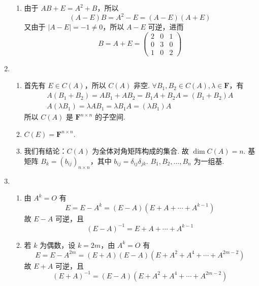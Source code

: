 \begin{enumerate}
\begin{enumerate}
              \item 由于 $ AB + E = A^2 + B $，所以
                    \[ (A - E)B = A^2 - E = (A - E)(A + E) \]
                    又由于 $ |A - E| = -1 \neq 0 $，所以 $ A - E $ 可逆，进而
                    \[ B = A + E = \begin{pmatrix}
                            2 & 0 & 1 \\
                            0 & 3 & 0 \\
                            1 & 0 & 2
                        \end{pmatrix} \]
          \end{enumerate}

    \item \begin{enumerate}
              \item 首先有 $ E \in C(A) $，所以 $ C(A) $ 非空. $ \forall B_1, B_2 \in C(A), \lambda \in \mathbf{F} $，有
                    \begin{gather*}
                        A(B_1 + B_2) = AB_1 + AB_2 = B_1A + B_2A = (B_1 + B_2)A \\
                        A(\lambda B_1) = \lambda AB_1 = \lambda B_1A = (\lambda B_1)A
                    \end{gather*}
                    所以 $ C(A) $ 是 $ \mathbf{F}^{n \times n} $ 的子空间.

              \item $ C(E) = \mathbf{F}^{n \times n} $.

              \item 我们有结论：$ C(A) $ 为全体对角矩阵构成的集合. 故 $ \dim C(A) = n $. 基矩阵 $ B_k = (b_{ij})_{n \times n} $，其中 $ b_{ij} = \delta_{ij} \delta_{jk} $. $ B_1, B_2, \ldots, B_n $ 为一组基.
          \end{enumerate}

    \item \begin{enumerate}
              \item 由 $ A^k = O $ 有
                    \[ E = E - A^k = (E - A)(E + A + \cdots + A^{k - 1}) \]
                    故 $ E - A $ 可逆，且
                    \[ (E - A)^{-1} = E + A + \cdots + A^{k - 1} \]

              \item 若 $ k $ 为偶数，设 $ k = 2m $，由 $ A^k = O $ 有
                    \[ E = E - A^{2m} = (E + A)(E - A)(E + A^2 + A^4 + \cdots + A^{2m - 2}) \]
                    故 $ E + A $ 可逆，且
                    \[ (E + A)^{-1} = (E - A)(E + A^2 + A^4 + \cdots + A^{2m - 2}) \]


\end{enumerate}
\end{enumerate}
